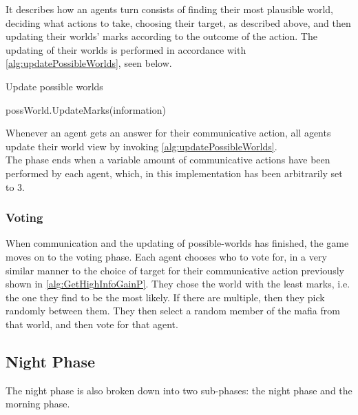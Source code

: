 \setcounter{algorithmcaption}{5}
It describes how an agents turn consists of finding their most plausible world,
deciding what actions to take, choosing their target, as described above, and
then updating their worlds' marks according to the outcome of the action.
The updating of their worlds is performed in accordance with
\cref{alg:updatePossibleWorlds}, seen below.
\begin{algorithm}[H]
	\caption{Update possible worlds}
	\begin{algorithmic}[1]
		\State possWorld.UpdateMarks(information)
		\EndFor
		\EndFor
		\EndFunction
	\end{algorithmic}\label{alg:updatePossibleWorlds}
\end{algorithm}
\setcounter{algorithmcaption}{6}
Whenever an agent gets an answer for their communicative action, all agents update their 
world view by invoking \cref{alg:updatePossibleWorlds}.\\

The phase ends when a variable amount of communicative actions have been
performed by each agent, which, in this implementation has been arbitrarily set
to 3.

\subsubsection{Voting}\label{sec:voting}
When communication and the updating of possible-worlds has finished, the game
moves on to the voting phase. Each agent chooses who to vote for, in a very
similar manner to the choice of target for their communicative action
previously shown in \cref{alg:GetHighInfoGainP}. They chose the world
with the least marks, i.e. the one they find to be the most likely. If there
are multiple, then they pick randomly between them. They then select a random
member of the mafia from that world, and then vote for that agent.

\subsection{Night Phase}\label{sec:nightPhase}
The night phase is also broken down into two sub-phases: the night phase and
the morning phase.

